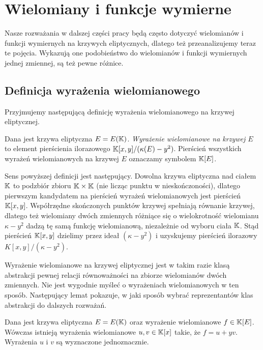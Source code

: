 \section{Wielomiany i funkcje wymierne}

Nasze rozważania w dalszej części pracy
będą często dotyczyć
wielomianów i funkcji wymiernych na krzywych eliptycznych,
dlatego też przeanalizujemy teraz te pojęcia.
Wykazują one podobieństwo do wielomianów i funkcji wymiernych jednej zmiennej,
są też pewne różnice.

\subsection*{Definicja wyrażenia wielomianowego}

Przyjmujemy następującą definicję
wyrażenia wielomianowego na krzywej eliptycznej.

\begin{definition}
Dana jest krzywa eliptyczna $E = E(\mathbb{K})$.
\emph{Wyrażenie wielomianowe na krzywej $E$}
to element pierścienia ilorazowego
$\mathbb{K}[x,y]/(\kappa(E) - y^2)$.
Pierścień wszystkich wyrażeń wielomianowych na krzywej $E$
oznaczamy symbolem $\mathbb{K}[E]$.
\end{definition}

Sens powyższej definicji jest następujący.
Dowolna krzywa eliptyczna nad ciałem $\mathbb{K}$ to podzbiór zbioru $\mathbb{K} \times \mathbb{K}$
(nie licząc punktu w nieskończoności),
dlatego pierwszym kandydatem na pierścień wyrażeń wielomianowych
jest pierścień $\mathbb{K}[x,y]$.
Współrzędne skończonych punktów krzywej spełniają równanie krzywej,
dlatego też wielomiany dwóch zmiennych różniące się
o wielokrotność wielomianu $\kappa- y^2$
dadzą tę samą funkcję wielomianową,
niezależnie od wyboru ciała $\mathbb{K}$.
Stąd pierścień $\mathbb{K}[x,y]$ dzielimy przez ideał $(\kappa- y^2)$
i uzyskujemy pierścień ilorazowy $K[x,y]/(\kappa - y^2)$.

Wyrażenie wielomianowe na krzywej eliptycznej
jest w takim razie klasą abstrakcji
pewnej relacji równoważności na zbiorze wielomianów dwóch zmiennych.
Nie jest wygodnie myśleć o wyrażeniach wielomianowych w ten sposób.
Następujący lemat pokazuje,
w jaki sposób wybrać reprezentantów klas abstrakcji
do dalszych rozważań.

\begin{theorem}
Dana jest krzywa eliptyczna $E = E(\mathbb{K})$
oraz wyrażenie wielomianowe $f \in \mathbb{K}[E]$.
Wówczas istnieją wyrażenia wielomianowe $u, v \in \mathbb{K}[x]$ takie,
że $f = u + yv$.
Wyrażenia $u$ i $v$ są wyznaczone jednoznacznie.
\end{theorem}

